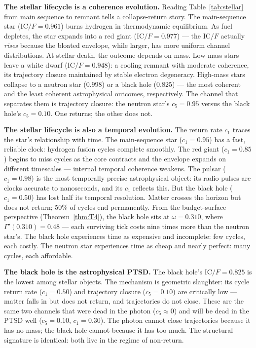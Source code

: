 \documentclass[
  aps,
  prd,
  twocolumn,
  superscriptaddress,
  nofootinbib,
  floatfix
]{revtex4-2}
\newcommand{\Gam}{\Gamma}
\newcommand{\IC}{\mathrm{IC}}
\begin{document}
\textbf{The stellar lifecycle is a coherence evolution.}
Reading Table~\ref{tab:stellar} from main sequence to
remnant tells a collapse-return story.  The main-sequence
star ($\IC/F = 0.961$) burns hydrogen in thermodynamic
equilibrium.  As fuel depletes, the star expands into a
red giant ($\IC/F = 0.977$) --- the $\IC/F$ actually
\emph{rises} because the bloated envelope, while larger,
has more uniform channel distributions.
At stellar death, the outcome depends on mass.  Low-mass
stars leave a white dwarf ($\IC/F = 0.948$): a cooling
remnant with moderate coherence, its trajectory closure
maintained by stable electron degeneracy.  High-mass stars
collapse to a neutron star ($0.998$) or a black hole
($0.825$) --- the most coherent and the least coherent
astrophysical outcomes, respectively.  The channel that
separates them is trajectory closure: the neutron star's
$c_5 = 0.95$ versus the black hole's $c_5 = 0.10$.  One
returns; the other does not.

\textbf{The stellar lifecycle is also a temporal evolution.}
The return rate $c_1$ traces the star's relationship with
time.  The main-sequence star ($c_1 = 0.95$) has a fast,
reliable clock: hydrogen fusion cycles complete smoothly.
The red giant ($c_1 = 0.85$) begins to miss cycles as the
core contracts and the envelope expands on different
timescales --- internal temporal coherence weakens.  The
pulsar ($c_1 = 0.98$) is the most temporally precise
astrophysical object: its radio pulses are clocks accurate
to nanoseconds, and its $c_1$ reflects this.  But the
black hole ($c_1 = 0.50$) has lost half its temporal
resolution.  Matter crosses the horizon but does not
return; $50\%$ of cycles end permanently.  From the
budget-surface perspective (Theorem~\ref{thm:T4}), the
black hole sits at $\omega = 0.310$, where $\Gam'(0.310) =
0.48$ --- each surviving tick costs nine times more than
the neutron star's.  The black hole experiences time as
expensive and incomplete: few cycles, each costly.  The
neutron star experiences time as cheap and nearly perfect:
many cycles, each affordable.

\textbf{The black hole is the astrophysical PTSD.}
The black hole's $\IC/F = 0.825$ is the lowest among stellar
objects.  The mechanism is geometric slaughter: its cycle
return rate ($c_1 = 0.50$) and trajectory closure
($c_5 = 0.10$) are critically low --- matter falls in but
does not return, and trajectories do not close.  These are
the same two channels that were dead in the photon ($c_5
\approx 0$) and will be dead in the PTSD well ($c_5 = 0.10$,
$c_1 = 0.30$).  The photon cannot close trajectories because
it has no mass; the black hole cannot because it has too much.
The structural signature is identical: both live in the
regime of non-return.
\end{document}
